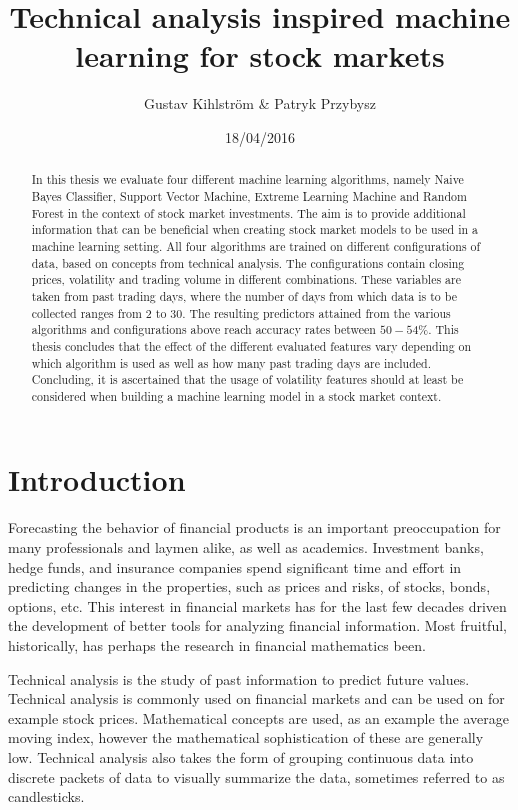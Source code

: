 \documentclass{article}
\begin{document}
\title{Technical analysis inspired machine learning for stock markets}
\author{Gustav Kihlström \& Patryk Przybysz}
\date{18/04/2016}
\maketitle
\newpage

\begin{abstract}
In this thesis we evaluate four different machine learning algorithms, namely Naive Bayes Classifier, Support Vector Machine, Extreme Learning Machine and Random Forest in the context of stock market investments. The aim is to provide additional information that can be beneficial when creating stock market models to be used in a machine learning setting. All four algorithms are trained on different configurations of data, based on concepts from technical analysis. The configurations contain closing prices, volatility and trading volume in different combinations. These variables are taken from past trading days, where the number of days from which data is to be collected ranges from 2 to 30. The resulting predictors attained from the various algorithms and configurations above reach accuracy rates between $50-54\%$. This thesis concludes that the effect of the different evaluated features vary depending on which algorithm is used as well as how many past trading days are included. Concluding, it is ascertained that the usage of volatility features should at least be considered when building a machine learning model in a stock market context. 
\end{abstract}
\newpage

\tableofcontents
\newpage

\section{Introduction}
Forecasting the behavior of financial products is an important preoccupation for many professionals and laymen alike, as well as academics. Investment banks, hedge funds, and insurance companies spend significant time and effort in predicting changes in the properties, such as prices and risks, of stocks, bonds, options, etc. This interest in financial markets has for the last few decades driven the development of better tools for analyzing financial information. Most fruitful, historically, has perhaps the research in financial mathematics been. 

Technical analysis is the study of past information to predict future values. Technical analysis is commonly used on financial markets and can be used on for example stock prices. Mathematical concepts are used, as an example the average moving index, however the mathematical sophistication of these are generally low. Technical analysis also takes the form of grouping continuous data into discrete packets of data to visually summarize the data, sometimes referred to as candlesticks.
\end{document}

